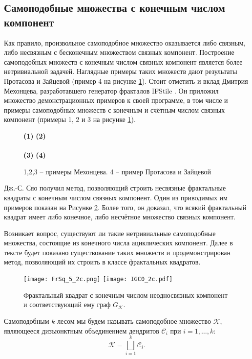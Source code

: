 \subsection{Самоподобные множества с конечным числом компонент}

Как правило, произвольное самоподобное множество оказывается либо связным, либо несвязным с бесконечным множеством связных компонент.
Построение самоподобных множеств с конечным числом связных компонент является  более нетривиальной   задачей.
Наглядные примеры таких множеств дают результаты Протасова и Зайцевой \cite{Zaitseva2021, Zaitseva2022} (пример 4 на рисунке \ref{fig:tilescomp}).
Стоит отметить и вклад Дмитрия Мехонцева, разработавшего генератор фракталов IFStile \cite{IFStile}.
Он приложил множество демонстрационных примеров к своей программе, в том числе и примеры самоподобных множеств с конечным и счётным числом связных компонент (примеры 1, 2 и 3 на рисунке \ref{fig:tilescomp}).

\begin{figure}[h]
{\bf(1)}
\hfill
{\bf(2)}
\\\qquad\\
{\bf(3)}
\hfill
{\bf(4)}
\caption{1,2,3 -- примеры Мехонцева. 4 -- пример Протасова и Зайцевой}
\label{fig:tilescomp}
\end{figure}

Дж.-С. Сяо \cite{Xiao2021} получил метод, позволяющий строить несвязные фрактальные квадраты с конечным числом связных компонент.
Один из приводимых им примеров показан на Рисунке \ref{fig:xiao2comp}.
Более того, он доказал, что всякий фрактальный квадрат  имеет либо конечное, либо несчётное множество связных компонент.

Возникает вопрос, существуют ли такие нетривиальные самоподобные множества, состоящие из конечного числа  ациклических компонент.
Далее в тексте будет показано существование таких множеств и продемонстрирован метод, позволяющий их строить в классе фрактальных квадратов.

\begin{figure}[h]
\texttt{[image: FrSq\_5\_2c.png]}
\hfill
\texttt{[image: IGC0\_2c.pdf]}
\caption{Фрактальный квадрат с конечным числом неодносвязных компонент и соответствующий ему граф $G_{\mathcal{K}}$.}
\label{fig:xiao2comp}
\end{figure}


\begin{definition}\label{def:forest}
Самоподобным $k$-лесом мы будем называть самоподобное множество $\mathcal{K}$, являющееся дизъюнктным объединением дендритов $\mathcal{C}_i$ при $i=1,\ldots,k$:
$$\mathcal{K}=\bigsqcup_{i=1}^k\mathcal{C}_i.$$
\end{definition}

